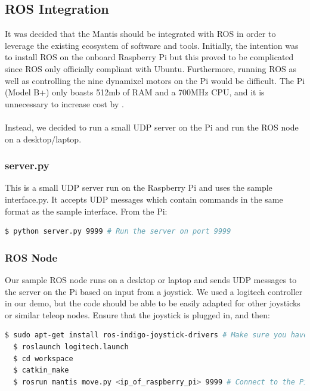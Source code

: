 \documentclass[]{article}
\begin{document}
\subsection{ROS Integration}
It was decided that the Mantis should be integrated with ROS in order to leverage the existing ecosystem of software and tools. Initially, the intention was to install ROS on the onboard Raspberry Pi but this proved to be complicated since ROS only officially compliant with Ubuntu. Furthermore, running ROS as well as controlling the nine dynamixel motors on the Pi would be difficult. The Pi (Model B+) only boasts 512mb of RAM and a 700MHz CPU, and it is unnecessary to increase cost by .
\\
\\
Instead, we decided to run a small UDP server on the Pi and run the ROS node on a desktop/laptop.

\subsubsection{server.py}
This is a small UDP server run on the Raspberry Pi and uses the sample interface.py. It accepts UDP messages which contain commands in the same format as the sample interface. From the Pi:
\begin{lstlisting}[language=bash]
  $ python server.py 9999 # Run the server on port 9999
\end{lstlisting}
\subsubsection{ROS Node}
Our sample ROS node runs on a desktop or laptop and sends UDP messages to the server on the Pi based on input from a joystick. We used a logitech controller in our demo, but the code should be able to be easily adapted for other joysticks or similar teleop nodes. Ensure that the joystick is plugged in, and then:
\begin{lstlisting}[language=bash]
  $ sudo apt-get install ros-indigo-joystick-drivers # Make sure you have the joystick drivers
  $ roslaunch logitech.launch
  $ cd workspace
  $ catkin_make
  $ rosrun mantis move.py <ip_of_raspberry_pi> 9999 # Connect to the Pi on port 9999
\end{lstlisting}
\end{document}
